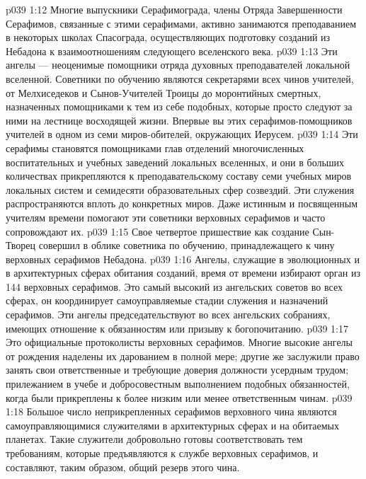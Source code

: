 \vs p039 1:12 Многие выпускники Серафимограда, члены Отряда Завершенности Серафимов, связанные с этими серафимами, активно занимаются преподаванием в некоторых школах Спасограда, осуществляющих подготовку созданий из Небадона к взаимоотношениям следующего вселенского века.
\vs p039 1:13 \pc {}\bibnobreakspace {} Эти ангелы --- неоценимые помощники отряда духовных преподавателей локальной вселенной. Советники по обучению являются секретарями всех чинов учителей, от Мелхиседеков и Сынов\hyp{}Учителей Троицы до моронтийных смертных, назначенных помощниками к тем из себе подобных, которые просто следуют за ними на лестнице восходящей жизни. Впервые вы  этих серафимов\hyp{}помощников учителей в одном из семи миров\hyp{}обителей, окружающих Иерусем.
\vs p039 1:14 Эти серафимы становятся помощниками глав отделений многочисленных воспитательных и учебных заведений локальных вселенных, и они в больших количествах прикрепляются к преподавательскому составу семи учебных миров локальных систем и семидесяти образовательных сфер созвездий. Эти служения распространяются вплоть до конкретных миров. Даже истинным и посвященным учителям времени помогают эти советники верховных серафимов и часто сопровождают их.
\vs p039 1:15 Свое четвертое пришествие как создание Сын\hyp{}Творец совершил в облике советника по обучению, принадлежащего к чину верховных серафимов Небадона.
\vs p039 1:16 \pc {}\bibnobreakspace {} Ангелы, служащие в эволюционных и в архитектурных сферах обитания созданий, время от времени избирают орган из 144 верховных серафимов. Это самый высокий из ангельских советов во всех сферах, он координирует самоуправляемые стадии служения и назначений серафимов. Эти ангелы председательствуют во всех ангельских собраниях, имеющих отношение к обязанностям или призыву к богопочитанию.
\vs p039 1:17 \pc {}\bibnobreakspace {} Это официальные протоколисты верховных серафимов. Многие высокие ангелы от рождения наделены их дарованием в полной мере; другие же заслужили право занять свои ответственные и требующие доверия должности усердным трудом; прилежанием в учебе и добросовестным выполнением подобных обязанностей, когда были прикреплены к более низким или менее ответственным чинам.
\vs p039 1:18 \pc {}\bibnobreakspace {} Большое число неприкрепленных серафимов верховного чина являются самоуправляющимися служителями в архитектурных сферах и на обитаемых планетах. Такие служители добровольно готовы соответствовать тем требованиям, которые предъявляются к службе верховных серафимов, и составляют, таким образом, общий резерв этого чина.
